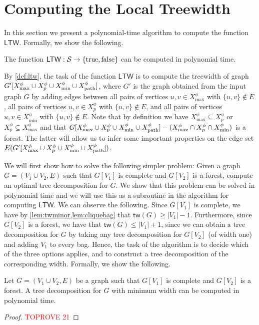 \documentclass[a4paper,UKenglish,cleveref, autoref, thm-restate, numberwithinsect]{lipics-v2021}
\newcounter{algorithm}
\newcommand{\tw}{\mathsf{tw}}
\newcommand{\ltw}{\mathsf{LTW}}
\newcommand{\dpath}{\textup{path}}
\newcommand{\true}{\textup{true}}
\newcommand{\false}{\textup{false}}
\begin{document}
\section{Computing the Local Treewidth}\label{sec:localtw}
In this section we present a polynomial-time algorithm to compute the function $\ltw$. Formally, we show the following.

\begin{proposition}\label{prop:computeltw}
The function $\ltw:\mathcal{S}\rightarrow\{\true,\false\}$ can be computed in polynomial time.
\end{proposition}

By \cref{def:ltw}, the task of the function $\ltw$ is to compute the treewidth of graph $G'[X^\phi_{\max}\cup X^\phi_p\cup X^\phi_{\min}\cup X^\phi_{\dpath}]$, where $G'$ is the graph obtained from the input graph $G$ by adding edges between all pairs of vertices $u,v\in  X^\phi_{\max}$ with $\{u,v\}\notin E$, all pairs of vertices $u,v\in  X^\phi_p$ with $\{u,v\}\notin E$, and all pairs of vertices $u,v\in X^\phi_{\min}$ with $\{u,v\}\notin E$. Note that by definition we have $X^\phi_{\max}\subseteq X^\phi_p$ or $X^\phi_p\subseteq X^\phi_{\max}$ and that $G[X^\phi_{\max}\cup X^\phi_p\cup X^\phi_{\min}\cup X^\phi_{\dpath}]-(X^\phi_{\max}\cap X^\phi_p\cap X^\phi_{\min})$ is a forest.
The latter will allow us to infer some important properties on the edge set $E(G'[X^\phi_{\max}\cup X^\phi_p\cup X^\phi_{\min}\cup X^\phi_{\dpath}])$.


 
We will first show how to solve the following simpler problem: Given a graph $G=(V_1\cup V_2,E)$ such that $G[V_1]$ is complete and $G[V_2]$ is a forest, compute an optimal tree decomposition for $G$. We show that this problem can be solved in polynomial time and we will use this as a subroutine in the algorithm for computing $\ltw$. 
We can observe the following. Since $G[V_1]$ is complete, we have by \cref{lem:twminor,lem:cliquebag} that $\tw(G)\ge |V_1|-1$. Furthermore, since $G[V_2]$ is a forest, we have that $\tw(G)\le |V_1|+1$, since we can obtain a tree decomposition for $G$ by taking any tree decomposition for $G[V_2]$ (of width one) and adding $V_1$ to every bag. Hence, the task of the algorithm is to decide which of the three options applies, and to construct a tree decomposition of the corresponding width. Formally, we show the following.

\begin{lemma}\label{lem:twoneclique}
Let $G=(V_1\cup V_2,E)$ be a graph such that $G[V_1]$ is complete and $G[V_2]$ is a forest. A tree decomposition for $G$ with minimum width can be computed in polynomial time.
\end{lemma}
\begin{proof}\textcolor{red}{TOPROVE 21}\end{proof}
\end{document}
